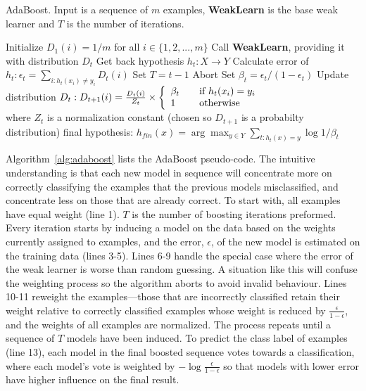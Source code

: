 \begin{algorithm}
\caption{AdaBoost. Input is a sequence of $m$ examples, {\bf WeakLearn} is the base weak learner and $T$ is the number of iterations.}
\begin{algorithmic}[1]
\STATE Initialize $D_{1}(i) = 1/m$ for all $i \in \{1,2,...,m\}$
\STATE Call {\bf WeakLearn}, providing it with distribution $D_{t}$
\STATE Get back hypothesis $h_{t} : X \to Y$
\STATE Calculate error of $h_{t}: \epsilon_{t} = \sum_{i:h_{t}(x_{i}) \ne y_{i}} D_{t}(i)$
\STATE Set $T = t - 1$
\STATE Abort
\ENDIF
\STATE Set $\beta_{t} = \epsilon_{t} / (1 - \epsilon_{t})$
\STATE Update distribution $D_{t}: D_{t+1}(i) = \frac{D_{t}(i)}{Z_{t}} \times \left\{
\begin{array}{l l}
  \beta_{t} & \quad \mbox{if $h_{t}(x_{i}) = y_{i}$}\\
  1 & \quad \mbox{otherwise}\\
\end{array} \right.$
\\ where $Z_{t}$ is a normalization constant (chosen so $D_{t+1}$ is a probabilty distribution)
\ENDFOR
\RETURN final hypothesis: $h_{fin}(x) = \arg \max_{y \in Y} \sum_{t:h_{t}(x)=y} \log 1 / \beta_{t}$
\end{algorithmic}
\label{alg:adaboost}
\end{algorithm}

Algorithm~\ref{alg:adaboost} lists the AdaBoost pseudo-code. The intuitive understanding is that each new model in sequence will concentrate more on correctly classifying the examples that the previous models misclassified, and concentrate less on those that are already correct. To start with, all examples have equal weight (line 1). $T$ is the number of boosting iterations preformed. Every iteration starts by inducing a model on the data based on the weights currently assigned to examples, and the error, $\epsilon$, of the new model is estimated on the training data (lines 3-5). Lines 6-9 handle the special case where the error of the weak learner is worse than random guessing. A situation like this will confuse the weighting process so the algorithm aborts to avoid invalid behaviour. Lines 10-11 reweight the examples---those that are incorrectly classified retain their weight relative to correctly classified examples whose weight is reduced by $\frac{\epsilon}{1 - \epsilon}$, and the weights of all examples are normalized. The process repeats until a sequence of $T$ models have been induced.
To predict the class label of examples (line 13), each model in the final boosted sequence votes towards a classification, where each model's vote is weighted by $-\log \frac{\epsilon}{1 - \epsilon}$ so that models with lower error have higher influence on the final result.

